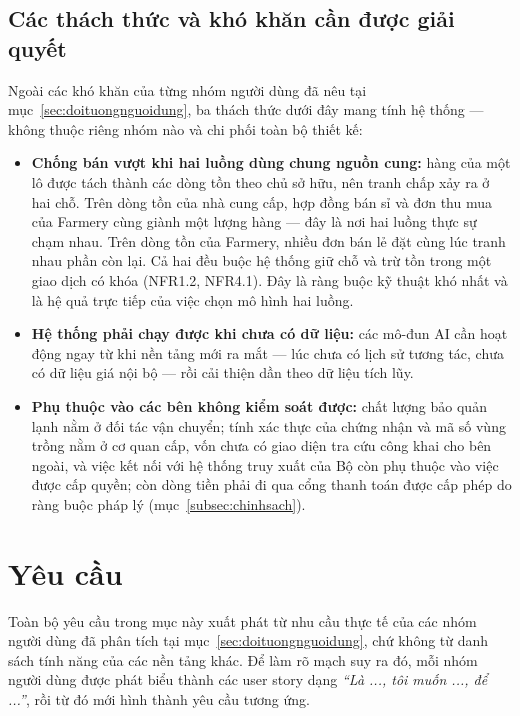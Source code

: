 \subsection{Các thách thức và khó khăn cần được giải quyết}
\label{subsec:thachthuc}

Ngoài các khó khăn của từng nhóm người dùng đã nêu tại mục~\ref{sec:doituongnguoidung}, ba thách thức dưới đây mang tính hệ thống --- không thuộc riêng nhóm nào và chi phối toàn bộ thiết kế:

\begin{itemize}
    \item \textbf{Chống bán vượt khi hai luồng dùng chung nguồn cung:} hàng của một lô được tách thành các dòng tồn theo chủ sở hữu, nên tranh chấp xảy ra ở hai chỗ. Trên dòng tồn của nhà cung cấp, hợp đồng bán sỉ và đơn thu mua của Farmery cùng giành một lượng hàng --- đây là nơi hai luồng thực sự chạm nhau. Trên dòng tồn của Farmery, nhiều đơn bán lẻ đặt cùng lúc tranh nhau phần còn lại. Cả hai đều buộc hệ thống giữ chỗ và trừ tồn trong một giao dịch có khóa (NFR1.2, NFR4.1). Đây là ràng buộc kỹ thuật khó nhất và là hệ quả trực tiếp của việc chọn mô hình hai luồng.
    \item \textbf{Hệ thống phải chạy được khi chưa có dữ liệu:} các mô-đun AI cần hoạt động ngay từ khi nền tảng mới ra mắt --- lúc chưa có lịch sử tương tác, chưa có dữ liệu giá nội bộ --- rồi cải thiện dần theo dữ liệu tích lũy.
    \item \textbf{Phụ thuộc vào các bên không kiểm soát được:} chất lượng bảo quản lạnh nằm ở đối tác vận chuyển; tính xác thực của chứng nhận và mã số vùng trồng nằm ở cơ quan cấp, vốn chưa có giao diện tra cứu công khai cho bên ngoài, và việc kết nối với hệ thống truy xuất của Bộ còn phụ thuộc vào việc được cấp quyền; còn dòng tiền phải đi qua cổng thanh toán được cấp phép do ràng buộc pháp lý (mục~\ref{subsec:chinhsach}).
\end{itemize}

\section{Yêu cầu}
\label{sec:yeucau}

Toàn bộ yêu cầu trong mục này xuất phát từ nhu cầu thực tế của các nhóm người dùng đã phân tích tại mục~\ref{sec:doituongnguoidung}, chứ không từ danh sách tính năng của các nền tảng khác. Để làm rõ mạch suy ra đó, mỗi nhóm người dùng được phát biểu thành các user story dạng \emph{``Là ..., tôi muốn ..., để ...''}, rồi từ đó mới hình thành yêu cầu tương ứng.

